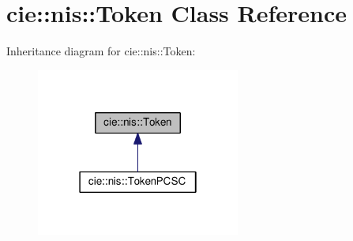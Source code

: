 \hypertarget{classcie_1_1nis_1_1Token}{\section{cie\-:\-:nis\-:\-:Token Class Reference}
\label{classcie_1_1nis_1_1Token}
}


Inheritance diagram for cie\-:\-:nis\-:\-:Token\-:
\nopagebreak
\begin{figure}[H]
\begin{center}
\leavevmode
\includegraphics[width=190pt]{classcie_1_1nis_1_1Token__inherit__graph}
\end{center}
\end{figure}
